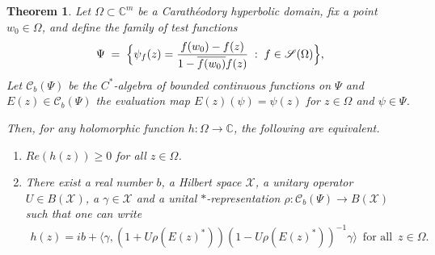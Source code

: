 \documentclass[12pt]{amsart}
\newtheorem{theorem}{Theorem}[section]
\theoremstyle{definition}
\numberwithin{equation}{section}
\newcommand{\X}{\mathscr{X}}
\newcommand{\CB}{\mathcal{C}_b(\Psi)}
\begin{document}
\begin{theorem}
	Let $\Omega\subset\mathbb{C}^m$ be a Carath\'eodory hyperbolic domain, fix a point $w_0\in\Omega$, and define the family of test functions
	\[
	\Psi \;=\; \Bigl\{\psi_f(z)=\frac{f(w_0)-f(z)}{1-\overline{f(w_0)}f(z)}\;:\; f\in\mathscr{S}(\Omega)\Bigr\},
	\]
	Let $\mathcal{C}_b(\Psi)$ be the $C^*$-algebra of bounded continuous functions on $\Psi$ and $E(z)\in\mathcal{C}_b(\Psi)$ the evaluation map $E(z)(\psi)=\psi(z)$ for $z\in\Omega$ and $\psi\in \Psi$.
	
	Then, for any holomorphic function $h:\Omega\rightarrow \mathbb{C}$, the following are equivalent.
	\begin{enumerate}
		\item $Re(h(z))\geq 0$ for all $z\in \Omega$.
		\item There exist a real number $b$, a Hilbert space $\X$, a unitary operator $U\in B(\X)$, a $\gamma\in \X$ and a unital $*$-representation $\rho:\CB\rightarrow B(\X)$ such that one can write
		\begin{align}\label{FormOfh}
			h(z)=ib+\Big\langle\gamma,(1+U\rho(E(z)^*))(1-U\rho(E(z)^*))^{-1}\gamma \Big\rangle\,\,\,\text{for all}\,\,\,z\in \Omega.
		\end{align}
	\end{enumerate}
\end{theorem}
\end{document}
